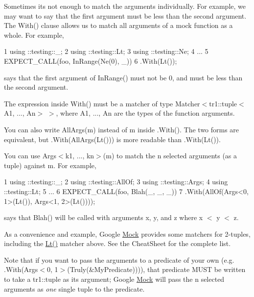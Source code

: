 Sometimes it\textquotesingle{}s not enough to match the arguments individually. For example, we may want to say that the first argument must be less than the second argument. The {\ttfamily With()} clause allows us to match all arguments of a mock function as a whole. For example,


\begin{DoxyCode}
1 using ::testing::\_;
2 using ::testing::Lt;
3 using ::testing::Ne;
4 ...
5   EXPECT\_CALL(foo, InRange(Ne(0), \_))
6       .With(Lt());
\end{DoxyCode}


says that the first argument of {\ttfamily In\+Range()} must not be 0, and must be less than the second argument.

The expression inside {\ttfamily With()} must be a matcher of type {\ttfamily Matcher$<$tr1\+::tuple$<$A1, ..., An$>$ $>$}, where {\ttfamily A1}, ..., {\ttfamily An} are the types of the function arguments.

You can also write {\ttfamily All\+Args(m)} instead of {\ttfamily m} inside {\ttfamily .With()}. The two forms are equivalent, but {\ttfamily .With(All\+Args(\+Lt()))} is more readable than {\ttfamily .With(\+Lt())}.

You can use {\ttfamily Args$<$k1, ..., kn$>$(m)} to match the {\ttfamily n} selected arguments (as a tuple) against {\ttfamily m}. For example,


\begin{DoxyCode}
1 using ::testing::\_;
2 using ::testing::AllOf;
3 using ::testing::Args;
4 using ::testing::Lt;
5 ...
6   EXPECT\_CALL(foo, Blah(\_, \_, \_))
7       .With(AllOf(Args<0, 1>(Lt()), Args<1, 2>(Lt())));
\end{DoxyCode}


says that {\ttfamily Blah()} will be called with arguments {\ttfamily x}, {\ttfamily y}, and {\ttfamily z} where {\ttfamily x $<$ y $<$ z}.

As a convenience and example, Google \hyperlink{classMock}{Mock} provides some matchers for 2-\/tuples, including the {\ttfamily \hyperlink{namespacetesting_ad621459957a8bcdd3c256b7940ecbf99}{Lt()}} matcher above. See the Cheat\+Sheet for the complete list.

Note that if you want to pass the arguments to a predicate of your own (e.\+g. {\ttfamily .With(Args$<$0, 1$>$(Truly(\&\+My\+Predicate)))}), that predicate M\+U\+ST be written to take a {\ttfamily tr1\+::tuple} as its argument; Google \hyperlink{classMock}{Mock} will pass the {\ttfamily n} selected arguments as {\itshape one} single tuple to the predicate.

